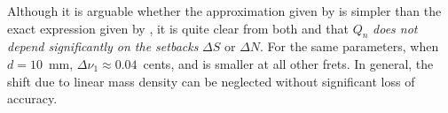 

Although it is arguable whether the approximation given by  is simpler than the exact expression given by , it is quite clear from both  and  that $Q_n$ \emph{does not depend significantly on the setbacks} $\Delta S$ or $\Delta N$. For the same parameters, when $d = 10$~mm, $\Delta \nu_{1} \approx 0.04$~cents, and is smaller at all other frets. In general, the shift due to linear mass density can be neglected without significant loss of accuracy.

